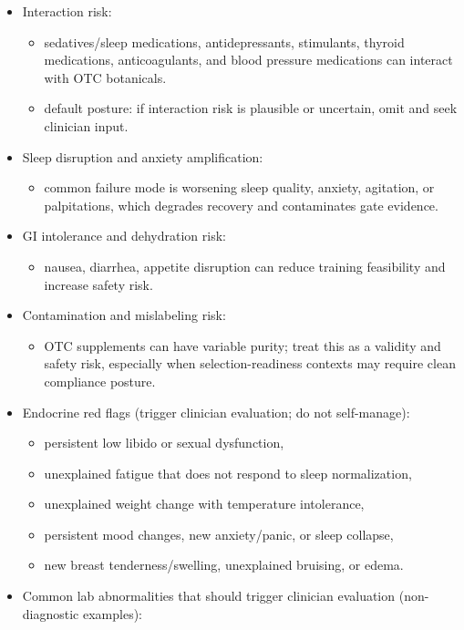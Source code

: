 \documentclass[10pt]{article}
\begin{document}
\begin{itemize}
\item Interaction risk:
  \begin{itemize}
  \item sedatives/sleep medications, antidepressants, stimulants, thyroid medications, anticoagulants, and blood pressure medications can interact with OTC botanicals.
  \item default posture: if interaction risk is plausible or uncertain, omit and seek clinician input.
  \end{itemize}
\item Sleep disruption and anxiety amplification:
  \begin{itemize}
  \item common failure mode is worsening sleep quality, anxiety, agitation, or palpitations, which degrades recovery and contaminates gate evidence.
  \end{itemize}
\item GI intolerance and dehydration risk:
  \begin{itemize}
  \item nausea, diarrhea, appetite disruption can reduce training feasibility and increase safety risk.
  \end{itemize}
\item Contamination and mislabeling risk:
  \begin{itemize}
  \item OTC supplements can have variable purity; treat this as a validity and safety risk, especially when selection-readiness contexts may require clean compliance posture.
  \end{itemize}
\item Endocrine red flags (trigger clinician evaluation; do not self-manage):
  \begin{itemize}
  \item persistent low libido or sexual dysfunction,
  \item unexplained fatigue that does not respond to sleep normalization,
  \item unexplained weight change with temperature intolerance,
  \item persistent mood changes, new anxiety/panic, or sleep collapse,
  \item new breast tenderness/swelling, unexplained bruising, or edema.
  \end{itemize}
\item Common lab abnormalities that should trigger clinician evaluation (non-diagnostic examples):

\end{itemize}
\end{document}
